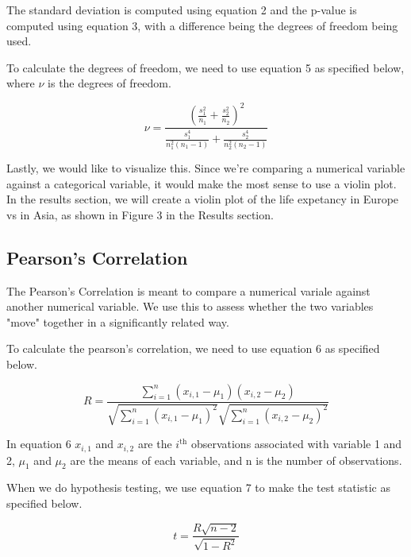 \documentclass[a4paper, twocolumn]{article}
\begin{document}
The standard deviation is computed using equation 2 and the p-value is computed using equation 3, with a difference
being the degrees of freedom being used. 

To calculate the degrees of freedom, we need to use equation 5 as specified below, where $\nu$ is the degrees of
freedom.

\begin{equation}
    \nu = \frac{\left(\frac{s_1^2}{n_1} + \frac{s_2^2}{n_2} \right)^2}
{\frac{s_1^4}{n_1^2 (n_1 - 1)} + \frac{s_2^4}{n_2^2 (n_2 - 1)}}
    \label{eq:degree-of-freedom}
\end{equation}
\begin{center}
\end{center}

Lastly, we would like to visualize this. Since we're comparing a numerical variable against a categorical variable,
it would make the most sense to use a violin plot. In the results section, we will create a violin plot of the life 
expetancy in Europe vs in Asia, as shown in Figure 3 in the Results section.

\subsection{Pearson's Correlation}
The Pearson's Correlation is meant to compare a numerical variale against another numerical variable. We use this to
assess whether the two variables "move" together in a significantly related way. 

To calculate the pearson's correlation, we need to use equation 6 as specified below.

\begin{equation}
    R = \frac{\sum_{i=1}^{n} (x_{i,1} - \mu_1)(x_{i,2} - \mu_2)}
{\sqrt{\sum_{i=1}^{n} (x_{i,1} - \mu_1)^2} \sqrt{\sum_{i=1}^{n} (x_{i,2} - \mu_2)^2}}
    \label{eq:pearson-coefficient}
\end{equation}
\begin{center}
\end{center}

In equation 6 $x_{i,1}$ and $x_{i,2}$ are the $i^{\text{th}}$ observations associated with variable 1 and 2, 
$\mu_1$ and $\mu_2$ are the means of each variable, and n is the number of observations. 

When we do hypothesis testing, we use equation 7 to make the test statistic as specified below.

\begin{equation}
    t = \frac{R \sqrt{n - 2}}{\sqrt{1 - R^2}}
    \label{eq:test-statistic-pearson-coefficient}
\end{equation}
\begin{center}
\end{center}
\end{document}
